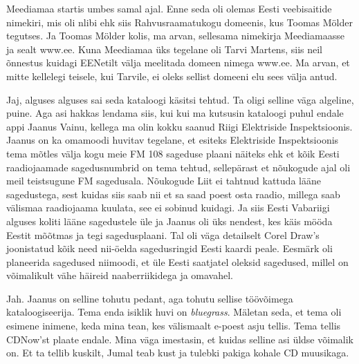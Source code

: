 
Meediamaa startis umbes samal ajal. Enne seda oli olemas  Eesti veebisaitide nimekiri, mis oli nlibi ehk siis Rahvusraamatukogu domeenis, kus Toomas Mölder tegutses. Ja Toomas Mölder kolis, ma arvan, sellesama nimekirja Meediamaasse ja sealt www.ee. Kuna Meediamaa üks tegelane oli Tarvi Martens, siis neil õnnestus kuidagi EENetilt välja meelitada domeen nimega www.ee. Ma arvan, et mitte kellelegi teisele, kui Tarvile, ei oleks sellist domeeni elu sees välja antud.


Jaj, alguses alguses sai seda kataloogi käsitsi tehtud. Ta oligi selline väga algeline, puine. Aga asi hakkas lendama siis, kui kui ma kutsusin kataloogi puhul endale appi Jaanus Vainu, kellega ma olin kokku saanud Riigi Elektriside Inspektsioonis. Jaanus on ka omamoodi huvitav tegelane, et esiteks Elektriside Inspektsioonis tema mõtles välja kogu meie FM 108 sageduse plaani näiteks ehk et kõik Eesti raadiojaamade sagedusnumbrid on tema tehtud, sellepärast et nõukogude ajal oli meil teistsugune FM sagedusala. Nõukogude Liit ei tahtnud kattuda lääne sagedustega, sest kuidas siis saab nii et sa saad poest osta raadio, millega saab välismaa raadiojaama kuulata,  see ei sobinud kuidagi. Ja siis Eesti Vabariigi alguses koliti lääne sagedustele üle ja Jaanus oli üks nendest, kes käis mööda Eestit  mõõtmas ja tegi sagedusplaani. Tal oli väga detailselt Corel Draw's joonistatud kõik need nii-öelda sagedusringid Eesti kaardi peale. Eesmärk oli  planeerida sagedused niimoodi, et üle Eesti saatjatel oleksid sagedused, millel on võimalikult vähe häireid naaberriikidega ja omavahel.  


Jah. Jaanus on selline tohutu pedant, aga tohutu sellise töövõimega kataloogiseerija. Tema enda isiklik huvi on \emph{bluegrass}. Mäletan seda, et tema oli esimene inimene, keda mina tean, kes välismaalt e-poest asju tellis.  Tema tellis CDNow'st  plaate endale. Mina väga imestasin, et kuidas selline asi üldse võimalik on. Et ta tellib kuskilt, Jumal teab kust ja tulebki pakiga kohale CD muusikaga.

